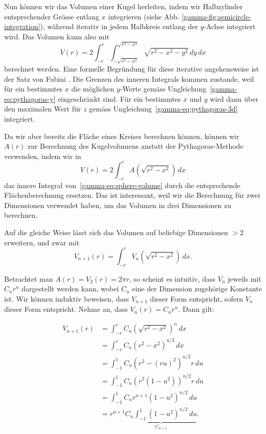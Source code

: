 Nun können wir das Volumen einer Kugel herleiten, indem wir Halbzylinder entsprechender
Grösse entlang $x$ integrieren (siehe Abb. \ref{gamma-fig:semicircle-integration}),
während iterativ in jedem Halbkreis entlang der $y$-Achse integriert wird. Das Volumen kann also mit
\begin{equation}
\label{gamma-eq:sphere-volume}
    V(r) = 2 \int_{-r}^{r} \int_{-\!\sqrt{r^2-x^2}}^{\!\sqrt{r^2-x^2}} \sqrt{r^2-x^2-y^2} \,dy \,dx
\end{equation}
berechnet werden. Eine formelle Begründung für diese iterative angehensweise ist der Satz von Fubini \cite{fubini1907integrali}.
%
%
Die Grenzen des inneren Integrals kommen zustande, weil für ein bestimmtes $x$ die möglichen $y$-Werte gemäss Ungleichung~\eqref{gamma-eq:pythagoras-y} eingeschränkt sind.
Für ein bestimmtes $x$ und $y$ wird dann über den maximalen Wert für $z$ gemäss Ungleichung~\eqref{gamma-eq:pythagoras-3d} integriert.



Da wir aber bereits die Fläche eines Kreises berechnen können, können wir $A(r)$
zur Berechnung des Kugelvolumens anstatt der Pythagoras-Methode verwenden, indem wir in
\begin{equation}
\label{gamma-eq:composed-sphere-volume}
    V(r) = 2 \int_{-r}^{r} A\left(\!\sqrt{r^2-x^2}\right) \,dx
\end{equation}
das innere Integral von~\eqref{gamma-eq:sphere-volume} durch die entsprechende Flächenberechnung ersetzen.
Das ist interessant, weil wir die Berechnung für zwei Dimensionen verwendet haben,
um das Volumen in drei Dimensionen zu berechnen.

Auf die gleiche Weise lässt sich das Volumen auf beliebige Dimensionen $> 2$ erweitern,
und zwar mit
\begin{equation}
\label{gamma-eq:n-sphere-volume-recursive}
    V_{n+1}(r) = \int_{-r}^{r} V_n\left(\!\sqrt{r^2-x^2}\right) \,dx
.
\end{equation}

\noindent
Betrachtet man $A(r) = V_2(r) = 2 \pi r$, so scheint es intuitiv,
dass $V_n$ jeweils mit $C_n r^n$ dargestellt werden kann, wobei $C_n$ eine der Dimension zugehörige Konstante ist.
Wir können induktiv beweisen, dass $V_{n+1}$ dieser Form entspricht, sofern
$V_n$ dieser Form entspricht.
Nehme an, dass $V_n(r) = C_n r^n$. Dann gilt:

\begin{align*}
         V_{n+1}(r) &= \int_{-r}^{r} C_n \left(\!\sqrt{r^2-x^2}\right)^n \,dx  \\ 
        &= \int_{-r}^{r} C_n \left(r^2-x^2\right)^{n/2} \,dx \\
        &= \int_{-1}^{1} C_n \left(r^2 - (ru)^2\right)^{n/2} r \,du \\
        &= \int_{-1}^{1} C_n \left(r^2 (1 - u^2)\right)^{n/2} r \,du \\
        &= \int_{-1}^{1} C_n r^{n+1} (1- u^2)^{n/2} \,du \\
        &= r^{n+1} \underbrace{C_n \int_{-1}^{1} (1- u^2)^{n/2} \,du}_{C_{n+1}}.
\end{align*}

